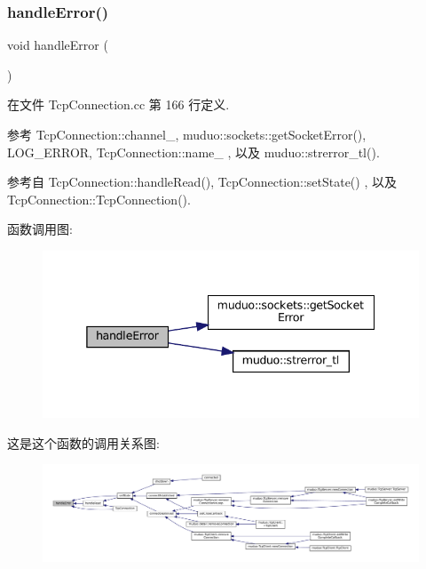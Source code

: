 \subsubsection{\texorpdfstring{handle\+Error()}{handleError()}}
{\footnotesize\ttfamily void handle\+Error (\begin{DoxyParamCaption}{ }\end{DoxyParamCaption})\hspace{0.3cm}{\ttfamily [private]}}



在文件 Tcp\+Connection.\+cc 第 166 行定义.



参考 Tcp\+Connection\+::channel\+\_\+, muduo\+::sockets\+::get\+Socket\+Error(), L\+O\+G\+\_\+\+E\+R\+R\+OR, Tcp\+Connection\+::name\+\_\+ , 以及 muduo\+::strerror\+\_\+tl().



参考自 Tcp\+Connection\+::handle\+Read(), Tcp\+Connection\+::set\+State() , 以及 Tcp\+Connection\+::\+Tcp\+Connection().

函数调用图\+:
\nopagebreak
\begin{figure}[H]
\begin{center}
\leavevmode
\includegraphics[width=338pt]{classmuduo_1_1TcpConnection_a70b275e63748ddd6da7d2171c540ccff_cgraph}
\end{center}
\end{figure}
这是这个函数的调用关系图\+:
\nopagebreak
\begin{figure}[H]
\begin{center}
\leavevmode
\includegraphics[width=350pt]{classmuduo_1_1TcpConnection_a70b275e63748ddd6da7d2171c540ccff_icgraph}
\end{center}
\end{figure}
\mbox{\label{classmuduo_1_1TcpConnection_afca05707020dd916739c07555d4769a0}} 
